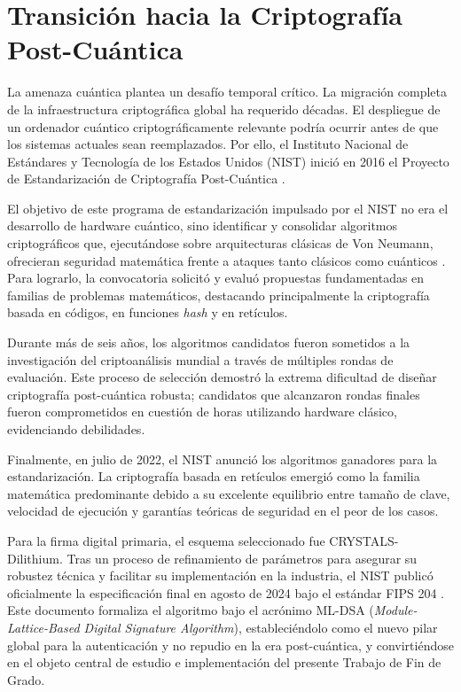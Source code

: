 \documentclass[11pt, a4paper]{report}
\theoremstyle{definition}
\begin{document}
\section{Transición hacia la Criptografía Post-Cuántica}

La amenaza cuántica plantea un desafío temporal crítico. La migración completa de la infraestructura criptográfica global ha requerido décadas. El despliegue de un ordenador cuántico criptográficamente relevante podría ocurrir antes de que los sistemas actuales sean reemplazados. Por ello, el Instituto Nacional de Estándares y Tecnología de los Estados Unidos (NIST) inició en 2016 el Proyecto de Estandarización de Criptografía Post-Cuántica \cite{chen2016report}.

El objetivo de este programa de estandarización impulsado por el NIST no era el desarrollo de hardware cuántico, sino identificar y consolidar algoritmos criptográficos que, ejecutándose sobre arquitecturas clásicas de Von Neumann, ofrecieran seguridad matemática frente a ataques tanto clásicos como cuánticos \cite{nist2016call}. Para lograrlo, la convocatoria solicitó y evaluó propuestas fundamentadas en familias de problemas matemáticos, destacando principalmente la criptografía basada en códigos, en funciones \textit{hash} y en retículos.

Durante más de seis años, los algoritmos candidatos fueron sometidos a la investigación del criptoanálisis mundial a través de múltiples rondas de evaluación. Este proceso de selección demostró la extrema dificultad de diseñar criptografía post-cuántica robusta; candidatos que alcanzaron rondas finales fueron comprometidos en cuestión de horas utilizando hardware clásico, evidenciando debilidades.

Finalmente, en julio de 2022, el NIST anunció los algoritmos ganadores para la estandarización. La criptografía basada en retículos emergió como la familia matemática predominante debido a su excelente equilibrio entre tamaño de clave, velocidad de ejecución y garantías teóricas de seguridad en el peor de los casos. 

Para la firma digital primaria, el esquema seleccionado fue CRYSTALS-Dilithium. Tras un proceso de refinamiento de parámetros para asegurar su robustez técnica y facilitar su implementación en la industria, el NIST publicó oficialmente la especificación final en agosto de 2024 bajo el estándar FIPS 204 \cite{nist_fips204}. Este documento formaliza el algoritmo bajo el acrónimo ML-DSA (\textit{Module-Lattice-Based Digital Signature Algorithm}), estableciéndolo como el nuevo pilar global para la autenticación y no repudio en la era post-cuántica, y convirtiéndose en el objeto central de estudio e implementación del presente Trabajo de Fin de Grado.
\end{document}
